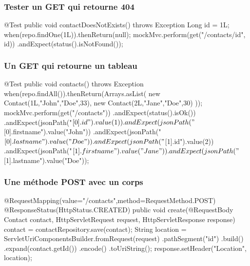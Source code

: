 \begin{frame}[fragile]
 \frametitle{Tester un GET qui retourne 404}
 
 \begin{javacode}
@Test
public void contactDoesNotExists() throws Exception {
    Long id = 1L;
    when(repo.findOne(1L)).thenReturn(null);
    mockMvc.perform(get("/contacts/{id}", id))
            .andExpect(status().isNotFound());
}
 \end{javacode}

\end{frame}



\begin{frame}[fragile]
 \frametitle{Un GET qui retourne un tableau}
 
 \begin{textcode}
 \end{textcode} 

 \begin{javacode}
@Test public void contacts() throws Exception {
    when(repo.findAll()).thenReturn(Arrays.asList(
            new Contact(1L,"John","Doe",33),
            new Contact(2L,"Jane","Doe",30)
    ));
    mockMvc.perform(get("/contacts"))
        .andExpect(status().isOk())
        .andExpect(jsonPath("$[0].id").value(1))
        .andExpect(jsonPath("$[0].firstname").value("John"))
        .andExpect(jsonPath("$[0].lastname").value("Doe"))
        .andExpect(jsonPath("$[1].id").value(2))
        .andExpect(jsonPath("$[1].firstname").value("Jane"))
        .andExpect(jsonPath("$[1].lastname").value("Doe"));
}
 \end{javacode}

\end{frame}

\begin{frame}[fragile]
 \frametitle{Une méthode POST avec un corps}
 
 \begin{javacode}
@RequestMapping(value="/contacts",method=RequestMethod.POST)
@ResponseStatus(HttpStatus.CREATED)
public void create(@RequestBody Contact contact, 
                   HttpServletRequest request, 
                   HttpServletResponse response) {
  contact = contactRepository.save(contact);
  String location = ServletUriComponentsBuilder.fromRequest(request)
    .pathSegment("{id}")
    .build()
    .expand(contact.getId())
    .encode()
    .toUriString();
  response.setHeader("Location", location);
}
 \end{javacode}

\end{frame}

